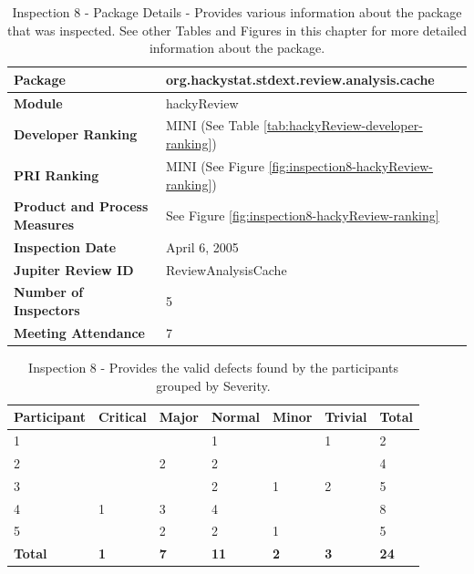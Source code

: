 \begin{table}[!h]
  \begin{center}
    \caption[Inspection 8 - Package Details]{Inspection 8 - Package Details 
      - Provides various information about the package that was
      inspected. See other Tables and Figures in this chapter for more
      detailed information about the package.}
    \label{tab:inspection-package-details-8}
    \begin{tabular}{|p{5.0cm}|p{8.0cm}|} \hline
{\bf Package} & org.hackystat.stdext.review.analysis.cache \\ \hline
{\bf Module} & hackyReview \\ \hline
{\bf Developer Ranking} & MINI (See Table \ref{tab:hackyReview-developer-ranking}) \\ \hline
{\bf PRI Ranking} & MINI (See Figure \ref{fig:inspection8-hackyReview-ranking}) \\ \hline
{\bf Product and Process Measures} & See Figure \ref{fig:inspection8-hackyReview-ranking} \\ \hline
{\bf Inspection Date} & April 6, 2005 \\ \hline
{\bf Jupiter Review ID} & ReviewAnalysisCache \\ \hline
{\bf Number of Inspectors} & 5 \\ \hline
{\bf Meeting Attendance} & 7 \\ \hline
    \end{tabular}
  \end{center}
\end{table}


\begin{table}[!h]
  \begin{center}
    \caption[Inspection 8 - Results by Severity]{Inspection 8
      - Provides the valid defects found by the participants grouped by
      Severity.}
    \label{tab:inspection-results-8}
    \begin{tabular}{|p{2.0cm}|p{1.5cm}|p{1.5cm}|p{1.5cm}|p{1.5cm}|p{1.5cm}|p{1.5cm}|} \hline
{\bf Participant} & {\bf Critical} & {\bf Major} 
& {\bf Normal} & {\bf Minor} & {\bf Trivial} & {\bf Total} \\ \hline
1 &   &   & 1 &   & 1 & 2 \\ \hline
2 &   & 2 & 2 &   &   & 4 \\ \hline
3 &   &   & 2 & 1 & 2 & 5 \\ \hline
4 & 1 & 3 & 4 &   &   & 8 \\ \hline
5 &   & 2 & 2 & 1 &   & 5 \\ \hline
{\bf Total} & {\bf 1} & {\bf 7} & {\bf 11} & {\bf 2} & {\bf 3} & {\bf 24} \\ \hline
    \end{tabular}
  \end{center}
\end{table}


